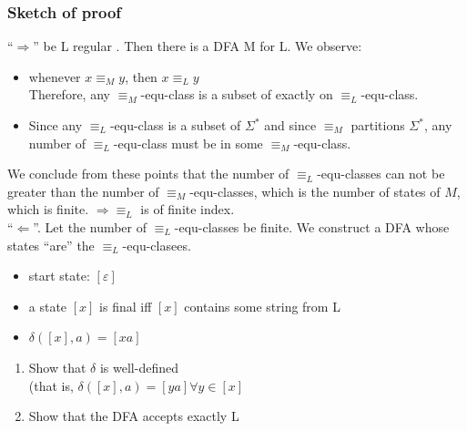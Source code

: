 \documentclass[a4paper]{article}
\begin{document}
    \subsubsection{Sketch of proof}
    ``$\Rightarrow$'' be L regular . Then there is a DFA M for L. We observe:
    \begin{itemize}
        \item whenever $x \equiv_M y$, then $x\equiv_L y$\\
            Therefore, any $\equiv_M$-equ-class is a subset of exactly on $\equiv_L$-equ-class.
        \item Since any $\equiv_L$-equ-class is a subset of $\Sigma^*$ and since
            $\equiv_M$ partitions $\Sigma^*$, any number of $\equiv_L$-equ-class
            must be in some $\equiv_M$-equ-class.
    \end{itemize}
    We conclude from these points that the number of $\equiv_L$-equ-classes can not be greater
    than the number of $\equiv_M$-equ-classes, which is the number of states of $M$,
    which is finite. $\Rightarrow \equiv_L$ is of finite index.\\
    ``$\Leftarrow$''. Let the number of $\equiv_L$-equ-classes be finite. We construct
    a DFA whose states ``are'' the $\equiv_L$-equ-clasees.
    \begin{itemize}
        \item start state: $\left[ \varepsilon \right]$
        \item a state $\left[ x \right]$ is final iff $\left[ x \right]$ contains
            some string from L
        \item $\delta(\left[ x \right], a) = \left[ xa \right]$
    \end{itemize}
    \begin{enumerate}
        \item Show that $\delta$ is well-defined\\
            (that is, $\delta(\left[ x \right],a)=\left[ ya \right] \forall y\in \left[ x \right]$
        \item Show that the DFA accepts exactly L
    \end{enumerate}
\end{document}
